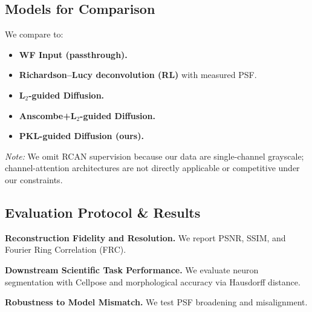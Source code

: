 \documentclass{article}
\begin{document}
\subsection{Models for Comparison}
We compare to:
\begin{itemize}
    \item \textbf{WF Input (passthrough).}
    \item \textbf{Richardson--Lucy deconvolution (RL)} with measured PSF.
    \item \textbf{L$_2$-guided Diffusion.}
    \item \textbf{Anscombe+L$_2$-guided Diffusion.}
    \item \textbf{PKL-guided Diffusion (ours).}
\end{itemize}
\textit{Note:} We omit RCAN supervision because our data are single-channel grayscale; channel-attention architectures are not directly applicable or competitive under our constraints.

\subsection{Evaluation Protocol \& Results}
\textbf{Reconstruction Fidelity and Resolution.} We report PSNR, SSIM, and Fourier Ring Correlation (FRC).



\textbf{Downstream Scientific Task Performance.} We evaluate neuron segmentation with Cellpose and morphological accuracy via Hausdorff distance.


\textbf{Robustness to Model Mismatch.} We test PSF broadening and misalignment.


\end{document}
